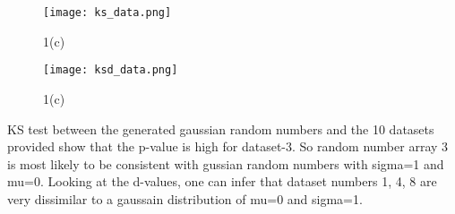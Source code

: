 \begin{figure}[H]
  \centering
  \texttt{[image: ks\_data.png]}
  \caption{1(c)}
  \label{fig:fig1}
\end{figure}

\begin{figure}[H]
  \centering
  \texttt{[image: ksd\_data.png]}
  \caption{1(c)}
  \label{fig:fig1}
\end{figure}

KS test between the generated gaussian random numbers and the 10 datasets provided show that the p-value is high for dataset-3. So random number array 3 is most likely to be consistent with gussian random numbers with sigma=1 and mu=0.
Looking at the d-values, one can infer that dataset numbers 1, 4, 8 are very dissimilar to a gaussain distribution of mu=0 and sigma=1.